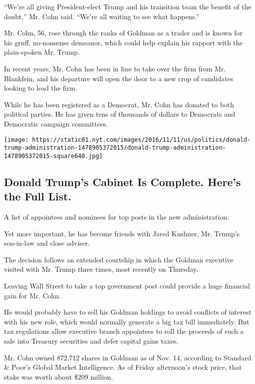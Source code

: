 ``We're all giving President-elect Trump and his transition team the
benefit of the doubt,'' Mr. Cohn said. ``We're all waiting to see what
happens.''

Mr. Cohn, 56, rose through the ranks of Goldman as a trader and is known
for his gruff, no-nonsense demeanor, which could help explain his
rapport with the plain-spoken Mr. Trump.

In recent years, Mr. Cohn has been in line to take over the firm from
Mr. Blankfein, and his departure will open the door to a new crop of
candidates looking to lead the firm.

While he has been registered as a Democrat, Mr. Cohn has donated to both
political parties. He has given tens of thousands of dollars to
Democrats and Democratic campaign committees.

\href{https://www.nytimes.com/interactive/2016/us/politics/donald-trump-administration.html}{}

\texttt{[image: https://static01.nyt.com/images/2016/11/11/us/politics/donald-trump-administration-1478905372015/donald-trump-administration-1478905372015-square640.jpg]}

\hypertarget{donald-trumps-cabinet-is-complete-heres-the-full-list}{%
\subsection{Donald Trump's Cabinet Is Complete. Here's the Full
List.}\label{donald-trumps-cabinet-is-complete-heres-the-full-list}}

A list of appointees and nominees for top posts in the new
administration.

Yet more important, he has become friends with Jared Kushner, Mr.
Trump's son-in-law and close adviser.

The decision follows an extended courtship in which the Goldman
executive visited with Mr. Trump three times, most recently on Thursday.

Leaving Wall Street to take a top government post could provide a huge
financial gain for Mr. Cohn.

He would probably have to sell his Goldman holdings to avoid conflicts
of interest with his new role, which would normally generate a big tax
bill immediately. But tax regulations allow executive branch appointees
to roll the proceeds of such a sale into Treasury securities and defer
capital gains taxes.

Mr. Cohn owned 872,712 shares in Goldman as of Nov. 14, according to
Standard \& Poor's Global Market Intelligence. As of Friday afternoon's
stock price, that stake was worth about \$209 million.

